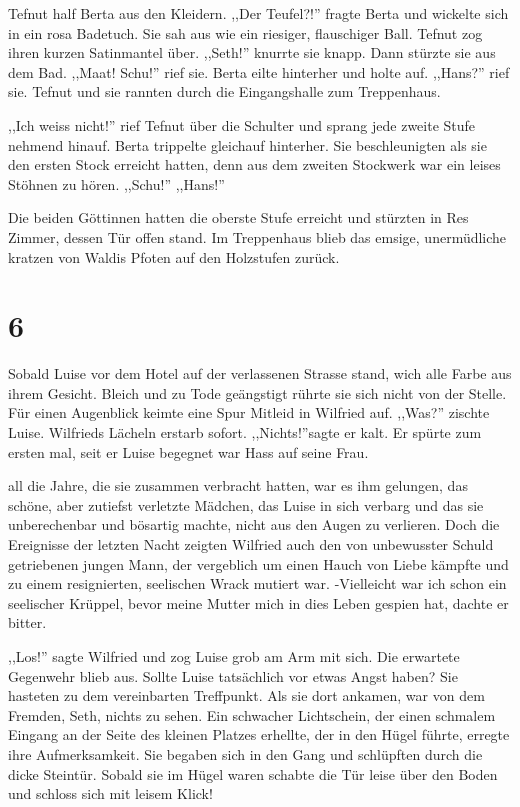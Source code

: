 Tefnut half Berta aus den Kleidern. ,,Der Teufel?!'' fragte Berta und wickelte sich in ein rosa Badetuch. Sie sah aus wie ein riesiger, flauschiger Ball. Tefnut zog ihren kurzen Satinmantel über. ,,Seth!'' knurrte sie knapp. Dann stürzte sie aus dem Bad. ,,Maat! Schu!'' rief sie. Berta eilte hinterher und holte auf. ,,Hans?'' rief sie. Tefnut und sie rannten durch die Eingangshalle zum Treppenhaus.

,,Ich weiss nicht!'' rief Tefnut über die Schulter und sprang jede zweite Stufe nehmend hinauf. Berta trippelte gleichauf hinterher. Sie beschleunigten als sie den ersten Stock erreicht hatten, denn aus dem zweiten Stockwerk war ein leises Stöhnen zu hören. ,,Schu!'' ,,Hans!''

Die beiden Göttinnen hatten die oberste Stufe erreicht und stürzten in Res Zimmer, dessen Tür offen stand. Im Treppenhaus blieb das emsige, unermüdliche kratzen von Waldis Pfoten auf den Holzstufen zurück.

\section*{6}

Sobald Luise vor dem Hotel auf der verlassenen Strasse stand, wich alle Farbe aus ihrem Gesicht. Bleich und zu Tode geängstigt rührte sie sich nicht von der Stelle. Für einen Augenblick keimte eine Spur Mitleid in Wilfried auf. ,,Was?'' zischte Luise. Wilfrieds Lächeln erstarb sofort. ,,Nichts!''sagte er kalt. Er spürte zum ersten mal, seit er Luise begegnet war Hass auf seine  Frau.

all die Jahre, die sie zusammen verbracht hatten, war es ihm gelungen, das schöne, aber zutiefst verletzte Mädchen, das Luise in sich verbarg und das sie unberechenbar und bösartig machte, nicht aus den Augen zu verlieren. Doch die Ereignisse der letzten Nacht zeigten Wilfried auch den von unbewusster Schuld getriebenen jungen Mann, der vergeblich um einen Hauch von Liebe kämpfte und zu einem resignierten, seelischen Wrack mutiert war. -Vielleicht war ich schon ein seelischer Krüppel, bevor meine Mutter mich in dies Leben gespien hat, dachte er bitter.

,,Los!'' sagte Wilfried und zog Luise grob am Arm mit sich. Die erwartete Gegenwehr blieb aus. Sollte Luise tatsächlich vor etwas Angst haben? Sie hasteten zu dem vereinbarten Treffpunkt. Als sie dort ankamen, war von dem Fremden, Seth, nichts zu sehen. Ein schwacher Lichtschein, der einen schmalem Eingang an der Seite des kleinen Platzes erhellte, der in den Hügel führte, erregte ihre Aufmerksamkeit. Sie begaben sich in den Gang und schlüpften durch die dicke Steintür. Sobald sie im Hügel waren schabte die Tür leise über den Boden und schloss sich mit leisem Klick!

